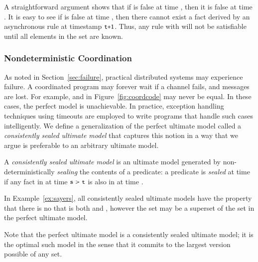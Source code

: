 A straightforward argument shows that if  is false at time , then it is false at time .  It is easy to see if  is false at time , then there cannot exist a  fact derived by an asynchronous rule at timestamp $\dedalus{t+1}$.  Thus, any rule with  will not be satisfiable until all elements in the  set are known.


\subsubsection{Nondeterministic Coordination}
As noted in Section~\ref{sec:failure}, practical distributed systems may experience failure.  A coordinated program may forever wait if a channel fails, and messages are lost.  For example,  and  in Figure~\ref{fig:coordcode} may never be equal.  In these cases, the perfect model is unachievable.  In practice, exception handling techniques using timeouts are employed to write programs that handle such cases intelligently.  We define a generalization of the perfect ultimate model called a {\em consistently sealed ultimate model} that captures this notion in a way that we argue is preferable to an arbitrary ultimate model.

\begin{definition}
A {\em consistently sealed ultimate model} is an ultimate model generated by non-deterministically {\em sealing} the contents of a predicate: a predicate  is {\em sealed} at time  if any fact in  at time $\dedalus{s} > \dedalus{t}$ is also in  at time .
\end{definition}

In Example~\ref{ex:sayers}, all consistently sealed ultimate models have the property that there is no  that is both  and , however the  set may be a superset of the  set in the perfect ultimate model.  

Note that the perfect ultimate model is a consistently sealed ultimate model; it is the optimal such model in the sense that it commits to the largest version possible of any set.

